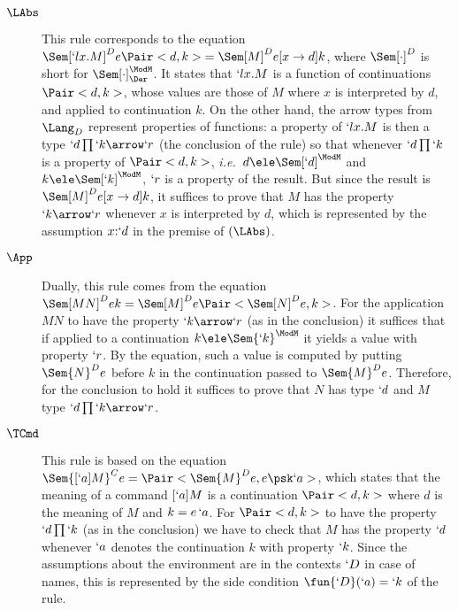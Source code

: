 \documentclass{lmcs}
\def\ie{\emph{i.e.}}
\begin{document}
 \begin{description}

 \item [$\LAbs$] 
This rule corresponds to the equation $\Sem[`lx.M]^D{ e }{ \Pair<d,k> } = \Sem[M]^D{ e[x \to d] }{ k }$, where $\Sem[\cdot]^D$ is short for $\Sem[\cdot]_\Der^{\ModM}$. 
It states that $`lx.M$ is a function of continuations $\Pair<d,k>$, whose values are those of $M$ where $x$ is interpreted by $d$, and applied to continuation $k$. 
On the other hand, the arrow types from $\Lang_D$ represent properties of functions:
a property of $`lx.M$ is then a type $`d\prod `k\arrow `r$ (the conclusion of the rule) so that whenever $`d\prod `k$ is a property of $\Pair<d,k>$, \ie~$d \ele \Sem[`d]^{\ModM}$ and $k \ele \Sem[`k]^{\ModM}$, $`r$ is a property of the result. 
But since the result is $\Sem[M]^D{ e[x \to d] }{ k }$, it suffices to prove that $M$ has the property $`k\arrow `r$ whenever $x$ is interpreted by $d$, which is represented by the assumption $x{:}`d$ in the premise of $(\LAbs)$.

 \item [$\App$] 
Dually, this rule comes from the equation $\Sem[MN]^D{ e }{ k } = \Sem[M]^D{ e }{ \Pair<\Sem[N]^D{ e } , k > }$. 
For the application $MN$ to have the property $`k\arrow `r$ (as in the conclusion)
it suffices that if applied to a continuation $k \ele \Sem{ `k }^{\ModM}$ it yields a value with property $`r$. By the equation, such a value is
computed by putting $\Sem{ N }^D{ e }$ before $k$ in the continuation passed to $\Sem{ M }^D{ e }$. 
Therefore, for the conclusion to hold it suffices to prove that $N$ has type $`d$ and $M$ type $`d\prod `k\arrow `r$. %

 \item [$\TCmd$] 
This rule is based on the equation $\Sem{ [`a]M}^C{ e } = \Pair<\Sem{ M }^D { e } , e\psk `a >$, which states that the meaning of a command $[`a]M$ is a continuation $\Pair<d,k>$ where $d$ is the meaning of $M$ and $k = e \, `a $. 
For $\Pair<d,k>$ to have the property $`d\prod `k$ (as in the conclusion) we have to check that $M$ has the property $`d$ whenever $`a$ denotes the continuation $k$ with property $`k$. 
Since the assumptions about the environment are in the contexts $`D $ in case of names, this is represented by the side condition $\fun{`D }(`a)=`k$ of the rule.



\end{description}
\end{document}
